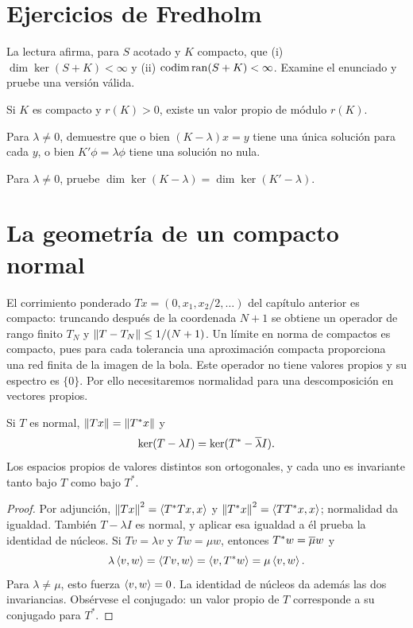\section{Ejercicios de Fredholm}
\begin{ejercicio}\label{ej:v3-l10-1}
La lectura afirma, para $S$ acotado y $K$ compacto, que (i) $\dim\ker(S+K)<\infty$ y (ii) $\operatorname{codim}\operatorname{ran}(S+K)<\infty$. Examine el enunciado y pruebe una versión válida.
\end{ejercicio}


\begin{ejercicio}\label{ej:v3-l10-2}
Si $K$ es compacto y $r(K)>0$, existe un valor propio de módulo $r(K)$.
\end{ejercicio}


\begin{ejercicio}\label{ej:v3-l10-3}
Para $\lambda\ne0$, demuestre que o bien $(K-\lambda)x=y$ tiene una única solución para cada $y$, o bien $K'\phi=\lambda\phi$ tiene una solución no nula.
\end{ejercicio}


\begin{ejercicio}\label{ej:v3-l10-4}
Para $\lambda\ne0$, pruebe $\dim\ker(K-\lambda)=\dim\ker(K'-\lambda)$.
\end{ejercicio}


\section{La geometría de un compacto normal}\label{lec:v3-11}
El corrimiento ponderado $Tx=(0,x_1,x_2/2,\ldots)$ del capítulo anterior es compacto: truncando después de la coordenada $N+1$ se obtiene un operador de rango finito $T_N$ y $\left\lVert T-T_N\right\rVert\le1/(N+1)$. Un límite en norma de compactos es compacto, pues para cada tolerancia una aproximación compacta proporciona una red finita de la imagen de la bola. Este operador no tiene valores propios y su espectro es $\{0\}$. Por ello necesitaremos normalidad para una descomposición en vectores propios.

\begin{lema}\label{v3:normal-nucleos}
Si $T$ es normal, $\left\lVert Tx\right\rVert=\left\lVert T^*x\right\rVert$ y
\[\ker(T-\lambda I)=\ker(T^*-\overline{\lambda} I).
\]
Los espacios propios de valores distintos son ortogonales, y cada uno es invariante tanto bajo $T$ como bajo $T^*$.
\end{lema}
\begin{proof}
Por adjunción, $\left\lVert Tx\right\rVert^2=\left\langle T^*Tx,x\right\rangle$ y $\left\lVert T^*x\right\rVert^2=\left\langle TT^*x,x\right\rangle$; normalidad da igualdad. También $T-\lambda I$ es normal, y aplicar esa igualdad a él prueba la identidad de núcleos. Si $Tv=\lambda v$ y $Tw=\mu w$, entonces $T^*w=\overline{\mu} w$ y
\[\lambda\left\langle v,w\right\rangle=\left\langle Tv,w\right\rangle=\left\langle v,T^*w\right\rangle=\mu\left\langle v,w\right\rangle.
\]
Para $\lambda\ne\mu$, esto fuerza $\left\langle v,w\right\rangle=0$. La identidad de núcleos da además las dos invariancias. Obsérvese el conjugado: un valor propio de $T$ corresponde a su conjugado para $T^*$.
\end{proof}

